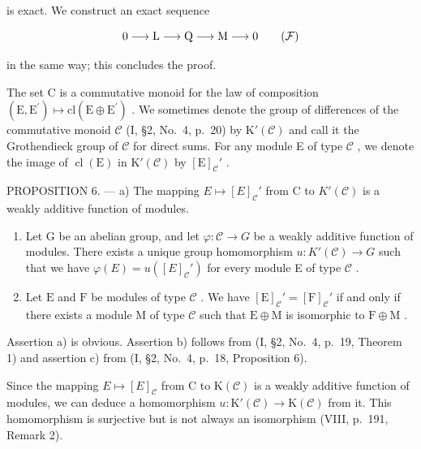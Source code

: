 is exact. We construct an exact sequence

\[
0 \longrightarrow \mathrm{L} \longrightarrow \mathrm{Q} \longrightarrow \mathrm{M} \longrightarrow 0\tag{\( \mathcal{F} \)}
\]

in the same way; this concludes the proof.

The set C is a commutative monoid for the law of composition \((\mathrm{E}, \mathrm{E}^{\prime}) \mapsto \mathrm{cl}(\mathrm{E} \oplus \mathrm{E}^{\prime})\) . We sometimes denote the group of differences of the commutative monoid \(\mathcal{C}\) (I, §2, No.~4, p.~20) by \(\mathrm{K}'(\mathcal{C})\) and call it the Grothendieck group of \(\mathcal{C}\) for direct sums. For any module E of type \(\mathcal{C}\) , we denote the image of \(\operatorname{cl}(\mathrm{E})\) in \(\mathrm{K}'(\mathcal{C})\) by \([\mathrm{E}]_{\mathcal{C}}'\) .

PROPOSITION 6. --- a) The mapping \(E \mapsto [E]_{\mathcal{C}}'\) from C to \(K'(\mathcal{C})\) is a weakly additive function of modules.

\begin{enumerate}
\def\labelenumi{\alph{enumi})}
\setcounter{enumi}{1}
\item
  Let G be an abelian group, and let \(\varphi : \mathcal{C} \to G\) be a weakly additive function of modules. There exists a unique group homomorphism \(u: K'(\mathcal{C}) \to G\) such that we have \(\varphi(E) = u([E]_{\mathcal{C}}')\) for every module E of type \(\mathcal{C}\) .
\item
  Let \(\mathrm{E}\) and \(\mathrm{F}\) be modules of type \(\mathcal{C}\) . We have \([\mathrm{E}]_{\mathcal{C}}' = [\mathrm{F}]_{\mathcal{C}}'\) if and only if there exists a module \(\mathrm{M}\) of type \(\mathcal{C}\) such that \(\mathrm{E} \oplus \mathrm{M}\) is isomorphic to \(\mathrm{F} \oplus \mathrm{M}\) .
\end{enumerate}

Assertion a) is obvious. Assertion b) follows from (I, §2, No.~4, p.~19, Theorem 1) and assertion c) from (I, §2, No.~4, p.~18, Proposition 6).

Since the mapping \(E \mapsto [E]_{\mathcal{C}}\) from C to \(\mathrm{K}(\mathcal{C})\) is a weakly additive function of modules, we can deduce a homomorphism \(u : \mathrm{K}'(\mathcal{C}) \to \mathrm{K}(\mathcal{C})\) from it. This homomorphism is surjective but is not always an isomorphism (VIII, p.~191, Remark 2).

